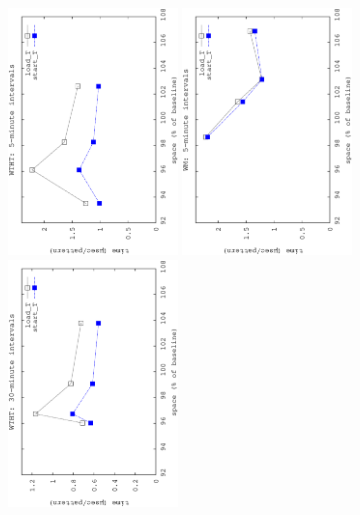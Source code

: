 	\begin{figure}[ht]
		\begin{center}
				{\includegraphics[angle=-90,width=0.4\textwidth]{figures_synt/porto_t5mht.eps}}
				{\includegraphics[angle=-90,width=0.4\textwidth]{figures_synt/porto_t5mwm.eps}}
				{\includegraphics[angle=-90,width=0.4\textwidth]{figures_synt/porto_t30mht.eps}}

\end{center}
\end{figure}
